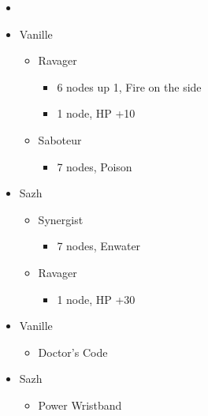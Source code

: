 \begin{menu}
\begin{multicols}{2}
\begin{itemize}
    \paradigm
    \begin{itemize}
        \item {}%
{\paradigmline{\rav}{\com}{}}%
{\paradigmline[2]{\textit{(\sab)}}{\textit{(\syn)}}{}}%
{\paradigmline{\sab}{\syn}{}}%
{\paradigmline{\rav}{\rav}{}}%
{\paradigmline{[\sab]}{(\rav)}{}}%
{\paradigmline{[\sab]}{\com}{}}
    \end{itemize}
    \columnbreak
    \crystarium
    \begin{itemize}
        \item Vanille
        \begin{itemize}
            \item Ravager
            \begin{itemize}
                \item 6 nodes up 1, Fire on the side
                \item 1 node, HP +10
            \end{itemize}
            \item Saboteur
            \begin{itemize}
                \item 7 nodes, Poison
            \end{itemize}
        \end{itemize}
        \item Sazh
        \begin{itemize}
            \item Synergist
            \begin{itemize}
                \item 7 nodes, Enwater
            \end{itemize}
            \item Ravager
            \begin{itemize}
                \item 1 node, HP +30
            \end{itemize}
        \end{itemize}
    \end{itemize}
    \equip
    \begin{itemize}
        \item Vanille
        \begin{itemize}
                \item Doctor's Code
        \end{itemize}
        \item Sazh
        \begin{itemize}
                \item Power Wristband
        \end{itemize}
    \end{itemize}
\end{itemize}
\end{multicols} 
\end{menu}

